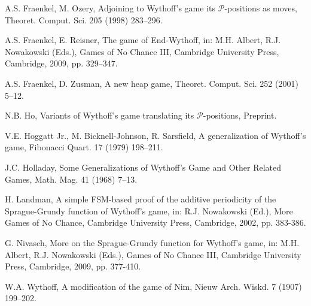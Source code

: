 \documentclass[12pt]{amsart}
\theoremstyle{plain}
\theoremstyle{definition}
\theoremstyle{remark}
\begin{document}
\begin{thebibliography}{19}
 A.S. Fraenkel, M. Ozery, Adjoining to Wythoff's game its ${\mathcal{P}}$-positions as moves, Theoret. Comput. Sci. 205 (1998) 283--296.

 A.S. Fraenkel, E. Reisner, The game of End-Wythoff, in: M.H. Albert, R.J. Nowakowski (Eds.), Games of No Chance III, Cambridge University Press, Cambridge, 2009, pp. 329--347.

 A.S. Fraenkel, D. Zusman, A new heap game, Theoret. Comput. Sci. 252 (2001) 5--12.

 N.B. Ho, Variants of Wythoff's game translating its ${\mathcal{P}}$-positions, Preprint.

 V.E. Hoggatt Jr., M. Bicknell-Johnson, R. Sarsfield, A generalization of Wythoff's game, Fibonacci Quart. 17 (1979) 198--211.

 J.C. Holladay, Some Generalizations of {W}ythoff's Game and Other Related Games, Math. Mag. 41 (1968)  7--13.

 H. Landman, A simple FSM-based proof of the additive periodicity of the {S}prague-{G}rundy function
of Wythoff's game, in: R.J. Nowakowski (Ed.), More Games of No Chance, Cambridge University Press,
Cambridge, 2002, pp. 383-386.

 G. Nivasch, More on the {S}prague-{G}rundy function for Wythoff's game, in: M.H. Albert, R.J. Nowakowski (Eds.), Games of No Chance III, Cambridge University Press, Cambridge, 2009, pp. 377-410.

 W.A. Wythoff, A modification of the game of {N}im, Nieuw Arch. Wiskd. 7 (1907) 199--202.

 \end{thebibliography}
\end{document}
